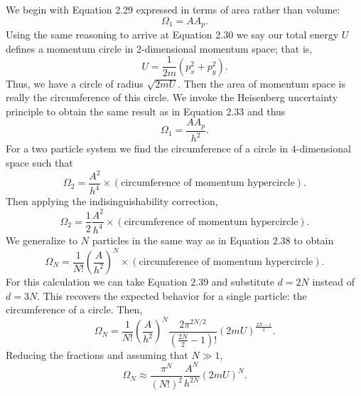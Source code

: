 \documentclass[a4paper, 12pt]{config/homework}
\begin{document}
We begin with Equation 2.29 expressed in terms of area rather than volume:
\[\Omega_1 = AA_p.\]
Using the same reasoning to arrive at Equation 2.30 we say our total energy \(U\) defines a momentum circle in 2-dimensional momentum space; that is,
\[U = \frac{1}{2m}\left(p_x^2 + p_y^2\right).\]
Thus, we have a circle of radius \(\sqrt{2mU}\). Then the area of momentum space is really the circumference of this circle. We invoke the Heisenberg uncertainty principle to obtain the same result as in Equation 2.33 and thus
\[\Omega_1 = \frac{A A_p}{h^2}.\]
For a two particle system we find the circumference of a circle in 4-dimensional space such that
\[\Omega_2 = \frac{A^2}{h^4}\times\left(\text{circumference of momentum hypercircle}\right).\]
Then applying the indisinguishability correction,
\[\Omega_2 = \frac{1}{2}\frac{A^2}{h^4}\times\left(\text{circumference of momentum hypercircle}\right).\]
We generalize to \(N\) particles in the same way as in Equation 2.38 to obtain
\[\Omega_N = \frac{1}{N!}\left(\frac{A}{h^2}\right)^N \times\left(\text{circumference of momentum hypercircle}\right).\]
For this calculation we can take Equation 2.39 and substitute \(d=2N\) instead of \(d=3N\). This recovers the expected behavior for a single particle: the circumference of a circle. Then,
\[\Omega_N = \frac{1}{N!}\left(\frac{A}{h^2}\right)^N \frac{2\pi^{2N/2}}{\left(\frac{2N}{2}-1\right)!} \left(2mU\right)^{\frac{2N-1}{2}}.\]
Reducing the fractions and assuming that \(N\gg 1\),
\[\Omega_N \approx \frac{\pi^N}{(N!)^2}\frac{A^N}{h^{2N}}\left(2mU\right)^{N}.\]
\end{document}

